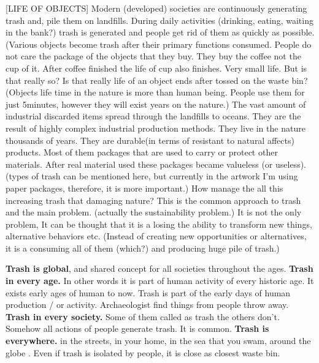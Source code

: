 [LIFE OF OBJECTS] Modern (developed) societies are continuously generating trash and, pile them on landfills. During daily activities (drinking, eating, waiting in the bank?) trash is generated and people get rid of them as quickly as possible. (Various objects become trash after their primary functions consumed. People do not care the package of the objects that they buy. They buy the coffee not the cup of it. After coffee finished the life of cup also finishes. Very small life. But is that really so? Is that really life of an object ends after tossed on the waste bin?  (Objects life time in the nature is more than human being. People use them for just 5minutes, however they will exist years on the nature.) The vast amount of industrial discarded items spread through the landfills to oceans. They are the result of highly complex industrial production methods.  They live in the nature thousands of years. They are durable(in terms of resistant to natural affects) products. Most of them packages that are used to carry or protect other materials. After real material used these packages became valueless (or useless). (types of trash can be mentioned here, but currently in the artwork I'm using paper packages, therefore, it is more important.) How manage the all this increasing trash that damaging nature?  This is the common approach to trash and the main problem. (actually the sustainability problem.) It is not the only problem, It can be thought that it is a losing the ability to transform new things, alternative behaviors etc. (Instead of creating new opportunities or alternatives, it is a consuming all of them (which?) and producing huge pile of trash.) 

\textbf{Trash is global}, and shared concept for all societies throughout the ages. 
\textbf{Trash in every age.} In other words it is part of human activity of every historic age. It exists early ages of human to now. Trash is part of the early days of human production / or activity. Archaeologist find things from people throw away. 
\textbf{Trash in every society.} Some of them called as trash the others don't. Somehow all actions of people generate trash. It is common. 
\textbf{Trash is everywhere.} in the streets, in your home, in the sea that you swam, around the globe . Even if trash is isolated by people, it is close as closest waste bin.

